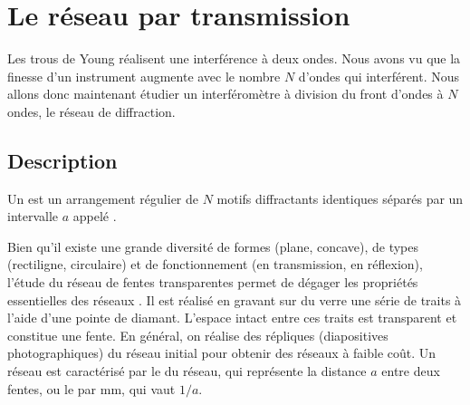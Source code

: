 \documentclass[12pt,fancy]{cours}
\begin{document}
\section{Le réseau par transmission}
 Les trous de Young réalisent une interférence à deux ondes. Nous avons vu que la finesse d'un instrument augmente avec le nombre $N$ d'ondes qui interférent. Nous allons donc maintenant étudier un interféromètre à division du front d'ondes à $N$ ondes, le réseau de diffraction.
\subsection{Description}

\begin{definition}\label{def:}
  Un  est un arrangement régulier de $N$ motifs diffractants identiques séparés par un intervalle $a$ appelé .
\end{definition}

Bien qu'il existe une grande diversité de formes (plane, concave), de types (rectiligne, circulaire) et de fonctionnement (en transmission, en réflexion), l'étude du réseau de fentes transparentes permet de dégager les propriétés essentielles des réseaux . Il est réalisé en gravant sur du verre une série de traits à l'aide d'une pointe de diamant. L'espace intact entre ces traits est transparent et constitue une fente. En général, on réalise des répliques (diapositives photographiques) du réseau initial pour obtenir des réseaux à faible coût.
 Un réseau est caractérisé par le  du réseau, qui représente la distance $a$ entre deux fentes, ou le  par mm, qui vaut $1/a$. 
\end{document}
